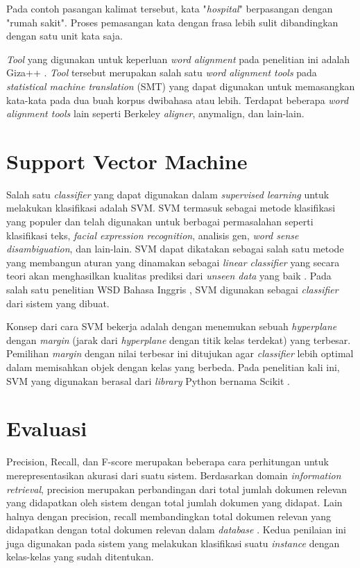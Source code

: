 Pada contoh pasangan kalimat tersebut, kata "\textit{hospital}" berpasangan dengan "rumah sakit". Proses pemasangan kata dengan frasa lebih sulit dibandingkan dengan satu unit kata saja.

\textit{Tool} yang digunakan untuk keperluan \textit{word alignment} pada penelitian ini adalah Giza++ \citep{och03:asc}. \textit{Tool} tersebut merupakan salah satu \textit{word alignment tools} pada \textit{statistical machine translation} (SMT) yang dapat digunakan untuk memasangkan kata-kata pada dua buah korpus dwibahasa atau lebih. Terdapat beberapa \textit{word alignment tools} lain seperti Berkeley \textit{aligner}, anymalign, dan lain-lain.

\section{Support Vector Machine}
Salah satu \textit{classifier} yang dapat digunakan dalam \textit{supervised learning} untuk melakukan klasifikasi adalah SVM. SVM termasuk sebagai metode klasifikasi yang populer dan telah digunakan untuk berbagai permasalahan seperti klasifikasi teks, \textit{facial expression recognition}, analisis gen, \textit{word sense disambiguation}, dan lain-lain. SVM dapat dikatakan sebagai salah satu metode yang membangun aturan yang dinamakan sebagai \textit{linear classifier} yang secara teori akan menghasilkan kualitas prediksi dari \textit{unseen data} yang baik \citep{fradkin2006support}. Pada salah satu penelitian WSD Bahasa Inggris \citep{zhong2010makes}, SVM digunakan sebagai \textit{classifier} dari sistem yang dibuat.

Konsep dari cara SVM bekerja adalah dengan menemukan sebuah \textit{hyperplane} dengan \textit{margin} (jarak dari \textit{hyperplane} dengan titik kelas terdekat) yang terbesar. Pemilihan \textit{margin} dengan nilai terbesar ini ditujukan agar \textit{classifier} lebih optimal dalam memisahkan objek dengan kelas yang berbeda. Pada penelitian kali ini, SVM yang digunakan berasal dari \textit{library} Python bernama Scikit \citep{scikit-learn}.

\section{Evaluasi}

Precision, Recall, dan F-score merupakan beberapa cara perhitungan untuk merepresentasikan akurasi dari suatu sistem. Berdasarkan domain \textit{information retrieval}, precision merupakan perbandingan dari total jumlah dokumen relevan yang didapatkan oleh sistem dengan total jumlah dokumen yang didapat. Lain halnya dengan precision, recall membandingkan total dokumen relevan yang didapatkan dengan total dokumen relevan dalam \textit{database} \citep{ting2011precision}. Kedua penilaian ini juga digunakan pada sistem yang melakukan klasifikasi suatu \textit{instance} dengan kelas-kelas yang sudah ditentukan. 

